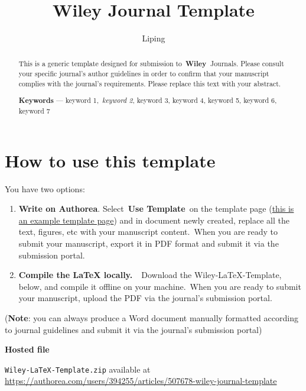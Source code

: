 \documentclass[alpha-refs]{wiley-article}
\title{Wiley Journal Template}
\author[1]{Liping}
\affil[1]{Affiliation not available}
\providecommand{\tightlist}{\setlength{\itemsep}{0pt}\setlength{\parskip}{0pt}}%
\begin{document}
\maketitle
{}
\begin{abstract}
This is a generic template designed for submission
to~\textbf{Wiley~}Journals. Please consult your specific journal's
author guidelines in order to confirm that your manuscript complies with
the journal's requirements. Please replace this text with your abstract.

\textbf{Keywords} --- keyword 1,~\emph{keyword 2}, keyword 3, keyword 4,
keyword 5, keyword 6, keyword 7%
\end{abstract}%




\section*{How to use this template}

{\label{707961}}

You have two options:

\begin{enumerate}
\tightlist
\item
  \textbf{Write on Authorea}. Select~\textbf{Use Template}~on the
  template page
  (\href{https://www.authorea.com/templates/quarterly_journal_of_the_royal_meteorological_society_qjrms_}{this
  is an example template page}) and in document newly created, replace
  all the text, figures, etc with your manuscript content.~When you are
  ready to submit your manuscript, export it in PDF format and submit it
  via the submission portal.
\item
  \textbf{Compile the LaTeX locally.~}~Download the
  Wiley-LaTeX-Template, below, and compile it offline on your
  machine.~When you are ready to submit your manuscript, upload the PDF
  via the journal's submission portal.
\end{enumerate}

(\textbf{Note}: you can always produce a Word document manually
formatted according to journal guidelines and submit it via the
journal's submission portal)~

\textbf{Hosted file}

\verb`Wiley-LaTeX-Template.zip` available at \url{https://authorea.com/users/394255/articles/507678-wiley-journal-template}

\par\null
\end{document}
